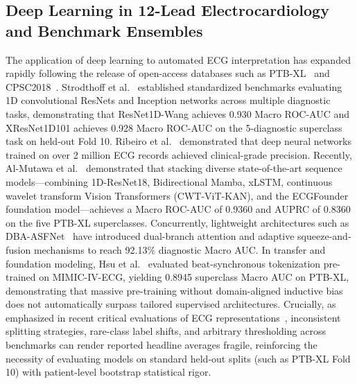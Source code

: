 \documentclass[12pt]{elsarticle}
\begin{document}
\subsection{Deep Learning in 12-Lead Electrocardiology and Benchmark Ensembles}
The application of deep learning to automated ECG interpretation has expanded rapidly following the release of open-access databases such as PTB-XL~\cite{wagner2020ptb} and CPSC2018~\cite{liu2018open}. Strodthoff et al.~\cite{strodthoff2020deep} established standardized benchmarks evaluating 1D convolutional ResNets and Inception networks across multiple diagnostic tasks, demonstrating that ResNet1D-Wang achieves 0.930 Macro ROC-AUC and XResNet1D101 achieves 0.928 Macro ROC-AUC on the 5-diagnostic superclass task on held-out Fold 10. Ribeiro et al.~\cite{ribeiro2020automatic} demonstrated that deep neural networks trained on over 2 million ECG records achieved clinical-grade precision. Recently, Al-Mutawa et al.~\cite{al2026stacking} demonstrated that stacking diverse state-of-the-art sequence models---combining 1D-ResNet18, Bidirectional Mamba, xLSTM, continuous wavelet transform Vision Transformers (CWT-ViT-KAN), and the ECGFounder foundation model---achieves a Macro ROC-AUC of 0.9360 and AUPRC of 0.8360 on the five PTB-XL superclasses. Concurrently, lightweight architectures such as DBA-ASFNet~\cite{dba_asfnet2024} have introduced dual-branch attention and adaptive squeeze-and-fusion mechanisms to reach 92.13\% diagnostic Macro AUC. In transfer and foundation modeling, Hsu et al.~\cite{mimic_ptbxl2026} evaluated beat-synchronous tokenization pre-trained on MIMIC-IV-ECG, yielding 0.8945 superclass Macro AUC on PTB-XL, demonstrating that massive pre-training without domain-aligned inductive bias does not automatically surpass tailored supervised architectures. Crucially, as emphasized in recent critical evaluations of ECG representations~\cite{goldberger2026ecgfix}, inconsistent splitting strategies, rare-class label shifts, and arbitrary thresholding across benchmarks can render reported headline averages fragile, reinforcing the necessity of evaluating models on standard held-out splits (such as PTB-XL Fold 10) with patient-level bootstrap statistical rigor.
\end{document}
